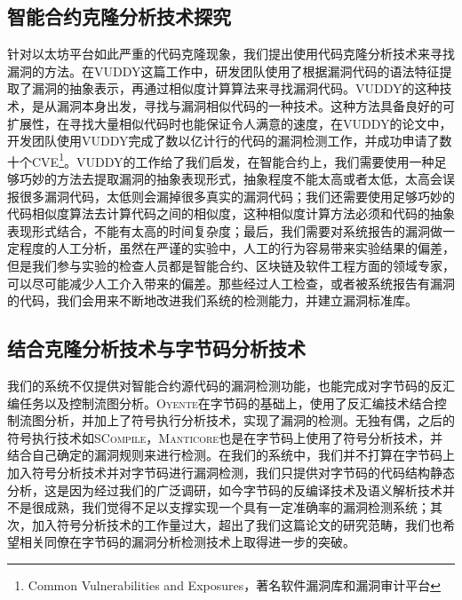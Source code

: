 \subsection{智能合约克隆分析技术探究}
针对以太坊平台如此严重的代码克隆现象，我们提出使用代码克隆分析技术来寻找漏洞的方法。在VUDDY\cite{vuddy}这篇工作中，研发团队使用了根据漏洞代码的语法特征提取了漏洞的抽象表示，再通过相似度计算算法来寻找漏洞代码。VUDDY的这种技术，是从漏洞本身出发，寻找与漏洞相似代码的一种技术。这种方法具备良好的可扩展性，在寻找大量相似代码时也能保证令人满意的速度，在VUDDY的论文中，开发团队使用VUDDY完成了数以亿计行的代码的漏洞检测工作，并成功申请了数十个CVE\footnote{Common Vulnerabilities and Exposures，著名软件漏洞库和漏洞审计平台}。VUDDY的工作给了我们启发，在智能合约上，我们需要使用一种足够巧妙的方法去提取漏洞的抽象表现形式，抽象程度不能太高或者太低，太高会误报很多漏洞代码，太低则会漏掉很多真实的漏洞代码；我们还需要使用足够巧妙的代码相似度算法去计算代码之间的相似度，这种相似度计算方法必须和代码的抽象表现形式结合，不能有太高的时间复杂度；最后，我们需要对系统报告的漏洞做一定程度的人工分析，虽然在严谨的实验中，人工的行为容易带来实验结果的偏差，但是我们参与实验的检查人员都是智能合约、区块链及软件工程方面的领域专家，可以尽可能减少人工介入带来的偏差。那些经过人工检查，或者被系统报告有漏洞的代码，我们会用来不断地改进我们系统的检测能力，并建立漏洞标准库。

\subsection{结合克隆分析技术与字节码分析技术}
我们的系统不仅提供对智能合约源代码的漏洞检测功能，也能完成对字节码的反汇编任务以及控制流图分析。\textsc{Oyente}\cite{oyente}在字节码的基础上，使用了反汇编技术结合控制流图分析，并加上了符号执行分析技术，实现了漏洞的检测。无独有偶，之后的符号执行技术如\textsc{SCompile}\cite{scompile}，\textsc{Manticore}\cite{manticore}也是在字节码上使用了符号分析技术，并结合自己确定的漏洞规则来进行检测。在我们的系统中，我们并不打算在字节码上加入符号分析技术并对字节码进行漏洞检测，我们只提供对字节码的代码结构静态分析，这是因为经过我们的广泛调研，如今字节码的反编译技术及语义解析技术并不是很成熟，我们觉得不足以支撑实现一个具有一定准确率的漏洞检测系统；其次，加入符号分析技术的工作量过大，超出了我们这篇论文的研究范畴，我们也希望相关同僚在字节码的漏洞分析检测技术上取得进一步的突破。

